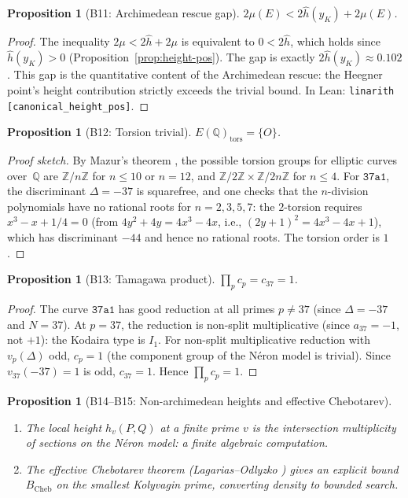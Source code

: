 \documentclass[11pt]{article}
\theoremstyle{plain}
\newtheorem{proposition}[theorem]{Proposition}
\theoremstyle{definition}
\theoremstyle{remark}
\newcommand{\Z}{\mathbb{Z}}
\newcommand{\Q}{\mathbb{Q}}
\newcommand{\hhat}{\hat{h}}
\begin{document}
\begin{proposition}[B11: Archimedean rescue gap]\label{prop:rescue-gap}
$2\mu(E) < 2\hhat(y_K) + 2\mu(E)$.
\end{proposition}

\begin{proof}
The inequality $2\mu < 2\hhat + 2\mu$ is equivalent to $0 < 2\hhat$, which holds since $\hhat(y_K) > 0$ (Proposition~\ref{prop:height-pos}). The gap is exactly $2\hhat(y_K) \approx 0.102$. This gap is the quantitative content of the Archimedean rescue: the Heegner point's height contribution strictly exceeds the trivial bound. In Lean: \texttt{linarith [canonical\_height\_pos]}.
\end{proof}

\begin{proposition}[B12: Torsion trivial]\label{prop:torsion}
$E(\Q)_{\mathrm{tors}} = \{O\}$.
\end{proposition}

\begin{proof}[Proof sketch]
By Mazur's theorem \cite{mazur}, the possible torsion groups for elliptic curves over~$\Q$ are $\Z/n\Z$ for $n \leq 10$ or $n = 12$, and $\Z/2\Z \times \Z/2n\Z$ for $n \leq 4$. For $\texttt{37a1}$, the discriminant $\Delta = -37$ is squarefree, and one checks that the $n$-division polynomials have no rational roots for $n = 2, 3, 5, 7$: the $2$-torsion requires $x^3 - x + 1/4 = 0$ (from $4y^2 + 4y = 4x^3 - 4x$, i.e., $(2y+1)^2 = 4x^3 - 4x + 1$), which has discriminant $-44$ and hence no rational roots. The torsion order is $1$.
\end{proof}

\begin{proposition}[B13: Tamagawa product]\label{prop:tamagawa}
$\prod_p c_p = c_{37} = 1$.
\end{proposition}

\begin{proof}
The curve $\texttt{37a1}$ has good reduction at all primes $p \neq 37$ (since $\Delta = -37$ and $N = 37$). At $p = 37$, the reduction is non-split multiplicative (since $a_{37} = -1$, not $+1$): the Kodaira type is $I_1$. For non-split multiplicative reduction with $v_p(\Delta)$ odd, $c_p = 1$ (the component group of the N\'eron model is trivial). Since $v_{37}(-37) = 1$ is odd, $c_{37} = 1$. Hence $\prod_p c_p = 1$.
\end{proof}

\begin{proposition}[B14--B15: Non-archimedean heights and effective Chebotarev]
\hfill
\begin{enumerate}[nosep]
\item The local height $h_v(P, Q)$ at a finite prime $v$ is the intersection multiplicity of sections on the N\'eron model: a finite algebraic computation.
\item The effective Chebotarev theorem \emph{(Lagarias--Odlyzko \cite{lagarias-odlyzko})} gives an explicit bound $B_{\mathrm{Cheb}}$ on the smallest Kolyvagin prime, converting density to bounded search.
\end{enumerate}
\end{proposition}
\end{document}
